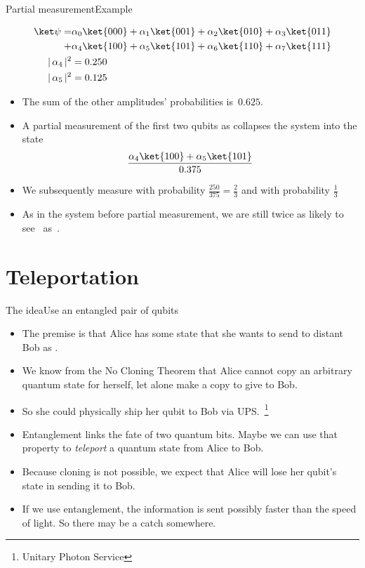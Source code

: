 \begin{frame}{Partial measurement}{Example}

\Vskip{-4em}\begin{align*}
  \QState{\relax}
   = & \alpha_{0} \ket{000}
  +  \alpha_{1} \ket{001}
  +  \alpha_{2} \ket{010}
  +  \alpha_{3} \ket{011} \\
  +  & \alpha_{4} \ket{100}
  +  \alpha_{5} \ket{101}
  +  \alpha_{6} \ket{110}
  +  \alpha_{7} \ket{111} \\
  \Prob{\alpha_{4}} & =0.250 \\
       \Prob{\alpha_{5}} & = 0.125
    \end{align*}
\Vskip{-3em}\begin{itemize}
   \item The sum of the other amplitudes' probabilities is~$0.625$.
   \item A partial measurement of the first two qubits as  collapses the system into the state
   \[
   \frac{\alpha_{4}\ket{100} + \alpha_{5}\ket{101}}{0.375}
   \]
   \item We subsequently measure  with probability $\frac{250}{375}=\frac{2}{3}$ and  with probability $\frac{1}{3}$
   \item As in the system before partial measurement, we are still twice as likely to see~ as~.
\end{itemize}
    
\end{frame}


\section*{Teleportation}

\begin{frame}{The idea}{Use an entangled pair of qubits}

\begin{itemize}
    \item The premise is that Alice has some state  that she wants to send to distant Bob as .
    \item We know from the No Cloning Theorem that Alice cannot copy an arbitrary quantum state for herself, let alone make a copy to give to Bob.
    \item So she could physically ship her qubit to Bob via UPS.~\footnote{Unitary Photon Service}
    \item Entanglement links the fate of two quantum bits.  Maybe we can use that property to \emph{teleport} a quantum state from Alice to Bob.
    \item Because cloning is not possible, we expect that Alice will lose her qubit's state in sending it to Bob.
    \item If we use entanglement, the information is sent possibly faster than the speed of light.  So there may be a catch somewhere.
\end{itemize}

\end{frame}

